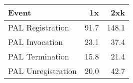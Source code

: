 \documentclass{standalone}
\begin{document}
%

\begin{tabular}{ l | r | r }\hline
Event & 1x & 2xk \\ \hline
PAL Registration & 91.7 & 148.1 \\
PAL Invocation & 23.1 & 37.4 \\
PAL Termination & 15.8 & 21.4 \\
PAL Unregistration & 20.0 & 42.7 \\
\end{tabular}
\end{document}
